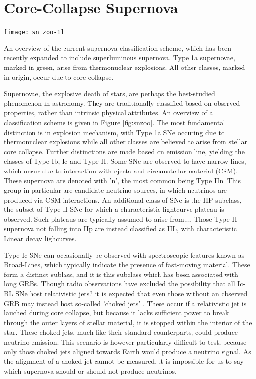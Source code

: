 \section{Core-Collapse Supernova}
 \begin{marginfigure}
	\texttt{[image: sn\_zoo-1]}
	\caption{An overview of the current supernova classification scheme, which has been recently expanded to include superluminous supernova. Type 1a supernovae, marked in green, arise from thermonuclear explosions. All other classes, marked in origin, occur due to core collapse.}
\end{marginfigure}
Supernovae, the explosive death of stars, are perhaps the best-studied phenomenon in astronomy. They are traditionally classified based on observed properties, rather than intrinsic physical attributes. An overview of a classification scheme is given in Figure \ref{fig:snzoo}. The most fundamental distinction is in explosion mechanism, with Type 1a SNe occuring due to thermonuclear explosions while all other classes are believed to arise from stellar core collapse. Further distinctions are made based on emission line, yielding the classes of Type Ib, Ic and Type II. Some SNe are observed to have narrow lines, which occur due to interaction with ejecta and circumstellar material (CSM). These supernova are denoted with 'n', the most common being Type IIn. This group in particular are candidate neutrino sources, in which neutrinos are produced via CSM interactions. An additional class of SNe is the IIP subclass, the subset of Type II SNe for which a characteristic lightcurve plateau is observed. Such plateaus are typically assumed to arise from....
Those Type II supernova not falling into IIp are instead classified as IIL, with characteristic Linear decay lighcurves.

Type Ic SNe can occasionally be observed with spectroscopic features known as Broad-Lines, which typically indicate the presence of fast-moving material. These form a distinct sublass, and it is this subclass which has been associated with long GRBs. Though radio observations have excluded the possibility that all Ic-BL SNe host relativistic jets? it is expected that even those without an observed GRB may instead host so-called 'choked jets' . These occur if a relativistic jet is lauched during core collapse, but because it lacks sufficient power to break through the outer layers of stellar material, it is stopped within the interior of the star. These choked jets, much like their standard counterparts, could produce neutrino emission. This scenario is however particularly difficult to test, because only those choked jets aligned towards Earth would produce a neutrino signal. As the alignment of a choked jet cannot be measured, it is impossible for us to say which supernova should or should not produce neutrinos. 

